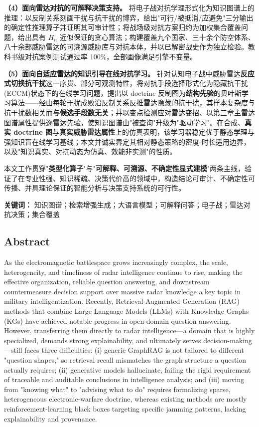 \documentclass[12pt,a4paper]{ctexart}
\begin{document}
\textbf{（4）面向雷达对抗的可解释决策支持。} 将电子战对抗学理形式化为知识图谱上的推理：以反制关系刻画干扰与抗干扰的博弈，给出"可行/被抵消/应避免"三分输出的确定性推理算子并证明其可审计性；将战场级对抗方案归约为加权集合覆盖问题，给出具有 $H_n$ 近似保证的贪心算法；构建覆盖九个国家、三十余个防空体系、八十余部威胁雷达的可溯源威胁库与对抗本体，并以已解密战史作为独立检验。教科书级对抗案例测试通过率 100\%，全部画像满足引擎不变量。

\textbf{（5）面向自适应雷达的知识引导在线对抗学习。} 针对认知电子战中威胁雷达\textbf{反应式切换抗干扰}这一序贯、部分可观测特性，将对抗手段选择形式化为隐藏抗干扰(ECCM)状态下的在线学习问题，提出以 doctrine 反制图为\textbf{结构先验}的贝叶斯学习算法——经由每轮干扰成败沿反制关系反推雷达隐藏的抗干扰，其样本复杂度与抗干扰数相关而\textbf{与候选手段数无关}；并以变点检测应对雷达变招、以第三章主雷达图谱属性提供逐雷达先验，使知识图谱由"被查询"升级为"驱动学习"。在合成、\textbf{真实 doctrine 图}与\textbf{真实威胁雷达属性}上的仿真表明，该学习器稳定优于静态学理与强知识盲在线学习基线；本文并诚实界定其相对静态策略的密度-时长适用边界，以及"知识真实、对抗动态为仿真、效能非实测"的性质。

本文工作贯穿"\textbf{类型化算子}"与"\textbf{可解释、可溯源、不确定性显式建模}"两条主线，验证了在专业性强、知识稀疏、决策代价高的领域中，构造结论可审计、不确定性可传播、并具理论保证的智能分析与决策支持系统的可行性。

\textbf{关键词：} 知识图谱；检索增强生成；大语言模型；可解释问答；电子战；雷达对抗决策；集合覆盖


\subsection*{Abstract}

As the electromagnetic battlespace grows increasingly complex, the scale, heterogeneity, and timeliness of radar intelligence continue to rise, making the effective organization, reliable question answering, and downstream countermeasure decision support over massive radar knowledge a key topic in military intelligentization. Recently, Retrieval-Augmented Generation (RAG) methods that combine Large Language Models (LLMs) with Knowledge Graphs (KGs) have achieved notable progress in open-domain question answering. However, transferring them directly to radar intelligence—a domain that is highly specialized, demands strong explainability, and ultimately serves decision-making—still faces three difficulties: (i) generic GraphRAG is not tailored to different "question shapes," so retrieval recall mismatches the graph structure a question actually requires; (ii) generative models hallucinate, failing the rigid requirement of traceable and auditable conclusions in intelligence analysis; and (iii) moving from "knowing what" to "advising what to do" requires formalizing sparse, heterogeneous electronic-warfare doctrine, whereas existing methods are mostly reinforcement-learning black boxes targeting specific jamming patterns, lacking explainability and provenance.
\end{document}
